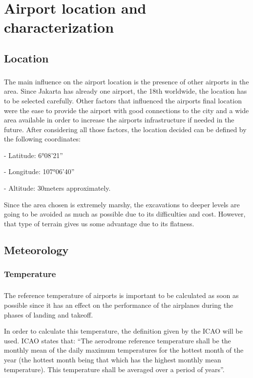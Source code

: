 \chapter{Airport location and characterization}
	\section{Location}
\paragraph{} The main influence on the airport location is the presence of other airports in the area. Since
Jakarta has already one airport, the 18th worldwide, the location has to be selected carefully.
Other factors that influenced the airports final location were the ease to provide the airport
with good connections to the city and a wide area available in order to increase the airports
infrastructure if needed in the future.
After considering all those factors, the location decided can be defined by the following coordinates:

- Latitude: 6°08'21''

- Longitude: 107°06'40''

- Altitude: 30meters approximately.

Since the area chosen is extremely marshy, the excavations to deeper levels are going to be
avoided as much as possible due to its difficulties and cost. However, that type of terrain gives
us some advantage due to its flatness.
	\section{Meteorology}
		\subsection{Temperature}
		\paragraph{}The reference temperature of airports is important to be calculated as soon as possible since it has an effect on the performance of the airplanes during the phases of landing and takeoff. 
		
		In order to calculate this temperature, the definition given by the ICAO will be used. ICAO states that: “The aerodrome reference temperature shall be the monthly mean of the daily maximum temperatures for the hottest month of the year (the hottest month being that which has the highest monthly mean temperature). This temperature shall be averaged over a period of years”.
		
